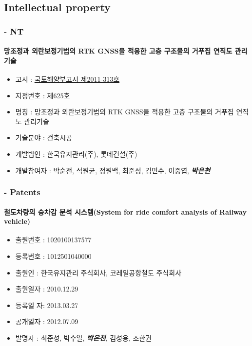 \subsection*{Intellectual property}

\subsubsection*{ - NT}

\paragraph{망조정과 외란보정기법의 RTK GNSS을 적용한 고층 구조물의 거푸집 연직도 관리기술}

\begin{itemize}
\item[]
  고시 : \href{http://www.kaia.re.kr/portal/newtec/view.do?searchCnd=1\&searchWrd=\&menuNo=200075\&frApntYear=\&toApntYear=\&pageUnit=10\&frApntNo=\&toApntNo=\&cate1=\&cate2=\&cate3=\&tecCat1=\&tecCat2=\&tecCat3=\&newtecCat1=\&newtecCat2=\&newtecCat3=\&dvlprNm=\%ED\%95\%9C\%EA\%B5\%AD\%EC\%9C\%A0\%EC\%A7\%80\%EA\%B4\%80\%EB\%A6\%AC\&ordDvs=\&pageIndex=1\&apntNo=625\&frMenu=list}{국토해양부고시
  제2011-313호}
\item[]
  지정번호 : 제625호
\item[]
  명칭 : 망조정과 외란보정기법의 RTK GNSS을 적용한 고층 구조물의 거푸집 연직도 관리기술
\item[]
  기술분야 : 건축시공
\item[]
  개발법인 : 한국유지관리(주), 롯데건설(주)
\item[]
  개발참여자 : 박순전, 석원균, 정원백, 최준성, 김민수, 이중엽, \emph{\textbf{박은천}}
\end{itemize}

\subsubsection{ - Patents}

\paragraph{철도차량의 승차감 분석 시스템(System for ride comfort analysis of Railway vehicle)}

\begin{itemize}
\item[]
  출원번호 : 1020100137577
\item[]
  등록번호 : 1012501040000
\item[]
  출원인 : 한국유지관리 주식회사, 코레일공항철도 주식회사
\item[]
  출원일자 : 2010.12.29
\item[]
  등록일 자: 2013.03.27
\item[]
  공개일자 : 2012.07.09
\item[]
  발명자 : 최준성, 박수열, \emph{\textbf{박은천}}, 김성용, 조한권
\end{itemize}

